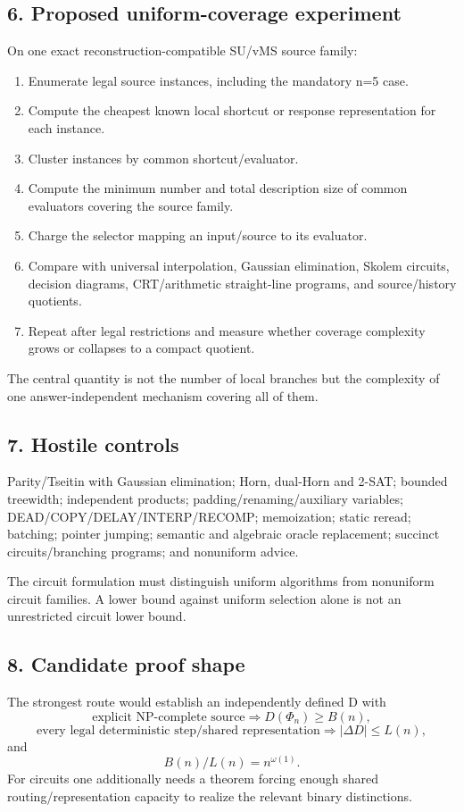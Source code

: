 \subsection*{6. Proposed uniform-coverage experiment}
On one exact reconstruction-compatible SU/vMS source family:
\begin{enumerate}
\item Enumerate legal source instances, including the mandatory n=5 case.
\item Compute the cheapest known local shortcut or response representation for each instance.
\item Cluster instances by common shortcut/evaluator.
\item Compute the minimum number and total description size of common evaluators covering the source family.
\item Charge the selector mapping an input/source to its evaluator.
\item Compare with universal interpolation, Gaussian elimination, Skolem circuits, decision diagrams, CRT/arithmetic straight-line programs, and source/history quotients.
\item Repeat after legal restrictions and measure whether coverage complexity grows or collapses to a compact quotient.
\end{enumerate}

The central quantity is not the number of local branches but the complexity of one answer-independent mechanism covering all of them.

\subsection*{7. Hostile controls}
Parity/Tseitin with Gaussian elimination; Horn, dual-Horn and 2-SAT; bounded treewidth; independent products; padding/renaming/auxiliary variables; DEAD/COPY/DELAY/INTERP/RECOMP; memoization; static reread; batching; pointer jumping; semantic and algebraic oracle replacement; succinct circuits/branching programs; and nonuniform advice.

The circuit formulation must distinguish uniform algorithms from nonuniform circuit families. A lower bound against uniform selection alone is not an unrestricted circuit lower bound.

\subsection*{8. Candidate proof shape}
The strongest route would establish an independently defined D with
\[
\text{explicit NP-complete source}\Longrightarrow D(\Phi_n)\ge B(n),
\]
\[
\text{every legal deterministic step/shared representation}\Longrightarrow |\Delta D|\le L(n),
\]
and
\[
B(n)/L(n)=n^{\omega(1)}.
\]
For circuits one additionally needs a theorem forcing enough shared routing/representation capacity to realize the relevant binary distinctions.

